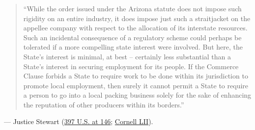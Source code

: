 \documentclass[12pt]{article}
\begin{document}
\begin{quote}
``While the order issued under the Arizona statute does not impose such rigidity on an entire industry, it does impose just such a straitjacket on the appellee company with respect to the allocation of its interstate resources. Such an incidental consequence of a regulatory scheme could perhaps be tolerated if a more compelling state interest were involved. But here, the State's interest is minimal, at best -- certainly less substantial than a State's interest in securing employment for its people. If the Commerce Clause forbids a State to require work to be done within its jurisdiction to promote local employment, then surely it cannot permit a State to require a person to go into a local packing business solely for the sake of enhancing the reputation of other producers within its borders.''
\end{quote}
\noindent --- Justice Stewart (\href{https://supreme.justia.com/cases/federal/us/397/137/}{397 U.S. at 146}; \href{https://www.law.cornell.edu/supremecourt/text/397/137}{Cornell LII}).
\end{document}
